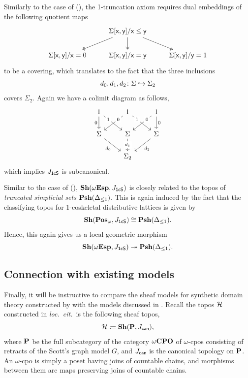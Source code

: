 \begin{example}[\AxiomOneCS]\label{exm:model1T}
  Similarly to the case of (\AxiomSL), the 1-truncation axiom requires dual embeddings of the following quotient maps
  \[\begin{tikzcd}
    & {\Sigma[\ms{x},\ms{y}]/\ms{x}\le\ms{y}} \\
    {\Sigma[\ms{x},\ms{y}]/\ms{x}=0} & {\Sigma[\ms{x},\ms{y}]/\ms{x}=\ms{y}} & {\Sigma[\ms{x},\ms{y}]/\ms{y}=1}
    \arrow[two heads, from=1-2, to=2-1]
    \arrow[two heads, from=1-2, to=2-2]
    \arrow[two heads, from=1-2, to=2-3]
  \end{tikzcd}\]
  to be a covering, which translates to the fact that the three inclusions
  \[ d_0,d_1,d_2 \colon \Sigma \hookrightarrow \Sigma_2 \]
  covers $\Sigma_2$. Again we have a colimit diagram as follows, 
  \[\begin{tikzcd}
    1 & 1 & 1 \\
    \Sigma & \Sigma & \Sigma \\
    & {\Sigma_2}
    \arrow["0"', from=1-1, to=2-1]
    \arrow["1"{description, pos=0.25}, from=1-1, to=2-2]
    \arrow["0"{description, pos=0.25}, from=1-2, to=2-1]
    \arrow["1"{description, pos=0.25}, from=1-2, to=2-3]
    \arrow["0"{description, pos=0.25}, from=1-3, to=2-2]
    \arrow["0", from=1-3, to=2-3]
    \arrow["{d_0}"', from=2-1, to=3-2]
    \arrow["{d_1}"{description}, from=2-2, to=3-2]
    \arrow["{d_2}", from=2-3, to=3-2]
  \end{tikzcd}\]
  which implies $J_{\mathsf{1cS}}$ is subcanonical.
  
  Similar to the case of (\AxiomSL), $\mathbf{Sh}(\omega\mathbf{Esp},J_{\mathsf{1cS}})$ is closely related to the topos of \emph{truncated simplicial sets} $\mathbf{Psh}(\Delta_{\le 1})$. This is again induced by the fact that the classifying topos for 1-coskeletal distributive lattices is given by 
  \[ \mathbf{Sh}(\mathbf{Pos}_\omega,J_{\mathsf{1cS}}) \cong \mathbf{Psh}(\Delta_{\le 1})\text{.} \]
  Hence, this again gives us a local geometric morphism
  \[ \mathbf{Sh}(\omega\mathbf{Esp},J_{\mathsf{1cS}}) \twoheadrightarrow \mathbf{Psh}(\Delta_{\le 1})\text{.} \]
\end{example}

\subsection{Connection with existing models}\label{subsec:compare}

Finally, it will be instructive to compare the sheaf models for synthetic domain theory constructed by \citet{FIORE1997151} with the models discussed in . Recall the topos $\mathcal{H}$ constructed in \emph{loc.\ cit.}\ is the following sheaf topos,
\[ \mathcal{H} \coloneq \mathbf{Sh}(\mathbf{P},J_{\mathsf{can}})\text{,} \]
where $\mathbf{P}$ be the full subcategory of the category $\omega\mathbf{CPO}$ of $\omega$-cpos consisting of retracts of the Scott's graph model $G$, and $J_{\mathsf{can}}$ is the canonical topology on $\mathbf{P}$. An $\omega$-cpo is simply a poset having joins of countable chains, and morphisms between them are maps preserving joins of countable chains.

